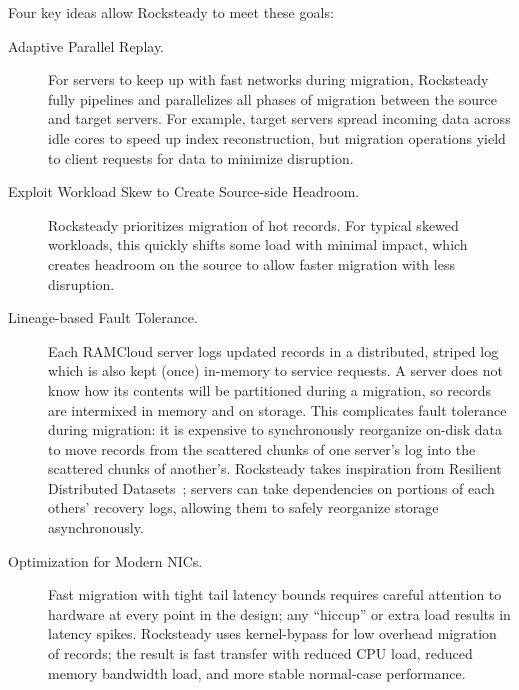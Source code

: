 \noindent
Four key ideas allow Rocksteady to meet these goals:
\begin{description}
\item[Adaptive Parallel Replay.]
For servers to keep up with fast networks during migration, Rocksteady fully
pipelines and parallelizes all phases of migration between the source and
target servers. For example, target servers spread incoming data across idle
cores to speed up index reconstruction, but migration operations yield to
client requests for data to minimize disruption.

\item[Exploit Workload Skew to Create Source-side Headroom.] Rocksteady
  prioritizes migration of hot records. For typical skewed workloads, this
  quickly shifts some load with minimal impact, which creates headroom on the
  source to allow faster migration with less disruption.

\item[Lineage-based Fault Tolerance.]
Each RAMCloud server logs updated records in a distributed, striped log which is
also kept (once) in-memory to service requests. A server does not know how its
contents will be partitioned during a migration, so records are intermixed
in memory and on storage. This complicates fault tolerance during
migration: it is expensive to synchronously reorganize on-disk data to move
records from the scattered chunks of one server's log into the scattered chunks
of another's.  Rocksteady takes inspiration from
Resilient Distributed Datasets~\cite{spark}; servers can take dependencies
on portions of each others' recovery logs, allowing them to safely
reorganize storage asynchronously.

\item[Optimization for Modern NICs.]
Fast migration with tight tail latency bounds requires careful attention to
hardware at every point in the design; any ``hiccup'' or extra load results in
latency spikes.
Rocksteady uses kernel-bypass for low overhead
migration of records;
the result is fast
transfer with reduced CPU load, reduced memory bandwidth load, and more
stable normal-case performance.

\end{description}
